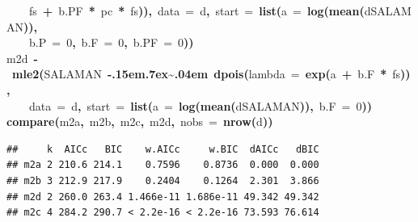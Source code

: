 \documentclass{article}
\makeatletter
\newcommand{\hlnumber}[1]{\textcolor[rgb]{0,0,0}{#1}}%
\newcommand{\hlfunctioncall}[1]{\textcolor[rgb]{.5,0,.33}{\textbf{#1}}}%
\newcommand{\hlkeyword}[1]{\textbf{#1}}%
\newcommand{\hlargument}[1]{\textcolor[rgb]{.69,.25,.02}{#1}}%
\newcommand{\hlassignement}[1]{\textbf{#1}}%
\newcommand{\hlsymbol}[1]{#1}%
\def\urltilda{\kern -.15em\lower .7ex\hbox{\~{}}\kern .04em}%
\newcommand{\hlstd}[1]{\textcolor[rgb]{0,0,0}{#1}}%
\newenvironment{kframe}{%
 \def\FrameCommand##1{\hskip\@totalleftmargin \hskip-\fboxsep
 \colorbox{shadecolor}{##1}\hskip-\fboxsep
     \hskip-\linewidth \hskip-\@totalleftmargin \hskip\columnwidth}%
 \MakeFramed {\advance\hsize-\width
   \@totalleftmargin\z@ \linewidth\hsize
   \@setminipage}}%
 {\par\unskip\endMakeFramed}
\newenvironment{knitrout}{}{} %
\makeatother
\begin{document}
\begin{knitrout}
{\begin{kframe}
\begin{flushleft}
\hlstd{}{\ }{\ }{\ }{\ }\hlsymbol{fs}{\ }\hlkeyword{+}{\ }\hlsymbol{b.PF}{\ }\hlkeyword{*}{\ }\hlsymbol{pc}{\ }\hlkeyword{*}{\ }\hlsymbol{fs}\hlkeyword{)}\hlkeyword{)}\hlkeyword{,}{\ }\hlargument{data}{\ }\hlargument{=}{\ }\hlsymbol{d}\hlkeyword{,}{\ }\hlargument{start}{\ }\hlargument{=}{\ }\hlfunctioncall{list}\hlkeyword{(}\hlargument{a}{\ }\hlargument{=}{\ }\hlfunctioncall{log}\hlkeyword{(}\hlfunctioncall{mean}\hlkeyword{(}\hlsymbol{d}\hlkeyword{\usebox{\hlnormalsizeboxdollar}}\hlsymbol{SALAMAN}\hlkeyword{)}\hlkeyword{)}\hlkeyword{,}\hspace*{\fill}\\
\hlstd{}{\ }{\ }{\ }{\ }\hlargument{b.P}{\ }\hlargument{=}{\ }\hlnumber{0}\hlkeyword{,}{\ }\hlargument{b.F}{\ }\hlargument{=}{\ }\hlnumber{0}\hlkeyword{,}{\ }\hlargument{b.PF}{\ }\hlargument{=}{\ }\hlnumber{0}\hlkeyword{)}\hlkeyword{)}\hspace*{\fill}\\
\hlstd{}\hlsymbol{m2d}{\ }\hlassignement{\usebox{\hlnormalsizeboxlessthan}-}{\ }\hlfunctioncall{mle2}\hlkeyword{(}\hlsymbol{SALAMAN}{\ }\hlkeyword{\urltilda{}}{\ }\hlfunctioncall{dpois}\hlkeyword{(}\hlargument{lambda}{\ }\hlargument{=}{\ }\hlfunctioncall{exp}\hlkeyword{(}\hlsymbol{a}{\ }\hlkeyword{+}{\ }\hlsymbol{b.F}{\ }\hlkeyword{*}{\ }\hlsymbol{fs}\hlkeyword{)}\hlkeyword{)}\hlkeyword{,}\hspace*{\fill}\\
\hlstd{}{\ }{\ }{\ }{\ }\hlargument{data}{\ }\hlargument{=}{\ }\hlsymbol{d}\hlkeyword{,}{\ }\hlargument{start}{\ }\hlargument{=}{\ }\hlfunctioncall{list}\hlkeyword{(}\hlargument{a}{\ }\hlargument{=}{\ }\hlfunctioncall{log}\hlkeyword{(}\hlfunctioncall{mean}\hlkeyword{(}\hlsymbol{d}\hlkeyword{\usebox{\hlnormalsizeboxdollar}}\hlsymbol{SALAMAN}\hlkeyword{)}\hlkeyword{)}\hlkeyword{,}{\ }\hlargument{b.F}{\ }\hlargument{=}{\ }\hlnumber{0}\hlkeyword{)}\hlkeyword{)}\hspace*{\fill}\\
\hlstd{}\hlfunctioncall{compare}\hlkeyword{(}\hlsymbol{m2a}\hlkeyword{,}{\ }\hlsymbol{m2b}\hlkeyword{,}{\ }\hlsymbol{m2c}\hlkeyword{,}{\ }\hlsymbol{m2d}\hlkeyword{,}{\ }\hlargument{nobs}{\ }\hlargument{=}{\ }\hlfunctioncall{nrow}\hlkeyword{(}\hlsymbol{d}\hlkeyword{)}\hlkeyword{)}\mbox{}
\normalfont
\end{flushleft}
\begin{verbatim}
##     k  AICc   BIC    w.AICc     w.BIC  dAICc   dBIC
## m2a 2 210.6 214.1    0.7596    0.8736  0.000  0.000
## m2b 3 212.9 217.9    0.2404    0.1264  2.301  3.866
## m2d 2 260.0 263.4 1.466e-11 1.686e-11 49.342 49.342
## m2c 4 284.2 290.7 < 2.2e-16 < 2.2e-16 73.593 76.614
\end{verbatim}
\end{kframe}}
\end{knitrout}
\end{document}
